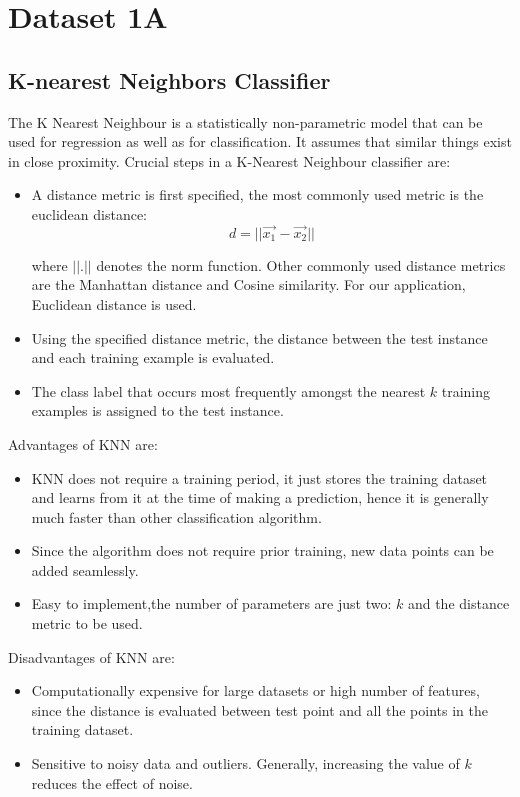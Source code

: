 \documentclass[11pt,a4paper]{article}
\newcommand{\noi}{\noindent}
\begin{document}
{\hypersetup{linkcolor=black}
 \tableofcontents}
\break


\section{Dataset 1A}
\subsection{K-nearest Neighbors Classifier}
\label{sec:1_1}

The K Nearest Neighbour is a statistically non-parametric model that can be used for regression as well as for classification. It assumes that similar things exist in close proximity.  
\noi
Crucial steps in a K-Nearest Neighbour classifier are:
\begin{itemize}
    \itemsep0em
    \item A distance metric is first specified, the most commonly used metric is the euclidean distance:
    \begin{equation}
        d=||\vec{x_1}-\Vec{x_2}||
    \end{equation}
    
    where $||.||$ denotes the norm function. Other commonly used distance metrics are the Manhattan distance and Cosine similarity. For our application, Euclidean distance is used. 
    \item Using the specified distance metric, the distance between the test instance and each training example is evaluated.
    \item The class label that occurs most frequently amongst the nearest $k$ training examples is assigned to the test instance.
\end{itemize}

\noi
Advantages of KNN are:
\begin{itemize}
    \itemsep0em
    \item KNN does not require a training period, it just stores the training dataset and learns from it at the time of making a prediction, hence it is generally much faster than other classification algorithm.
    \item Since the algorithm does not require prior training, new data points can be added seamlessly. 
    \item Easy to implement,the number of parameters are just two: $k$ and the distance metric to be used.
\end{itemize}

\noi
Disadvantages of KNN are:
\begin{itemize}
    \itemsep0em
    \item Computationally expensive for large datasets or high number of features, since the distance is evaluated between test point and all the points in the training dataset. 
    \item Sensitive to noisy data and outliers. Generally, increasing the value of $k$ reduces the effect of noise.
\end{itemize}
\end{document}
